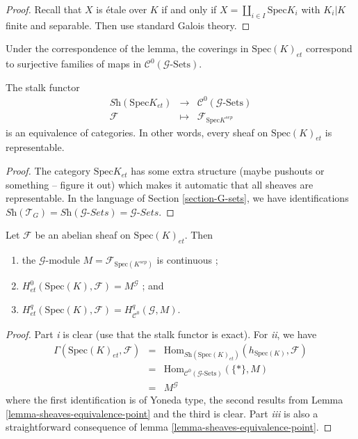 \begin{proof}
Recall that $X$ is \'etale over $K$ if and only if $X=\coprod_{i\in I}
\text{Spec} K_i$ with $K_i | K$ finite and separable. Then use standard Galois
theory.
\end{proof}

\begin{remark}
\label{remark-covering-surjective}
Under the correspondence of the lemma, the coverings in
$\text{Spec}(K)_{et}$ correspond to surjective families of maps in
$\mathcal{C}^0(\mathcal{G}\text{-Sets})$.
\end{remark}

\begin{lemma}
\label{lemma-sheaves-equivalence-point}
The stalk functor
$$
\begin{matrix}
\textit{Sh}(\text{Spec} K_{et}) & \longrightarrow &
\mathcal{C}^0(\mathcal{G}\text{-Sets}) \\
\mathcal{F} & \longmapsto & \mathcal{F}_{\text{Spec} K^{sep}}
\end{matrix}
$$
is an equivalence of categories. In other words, every sheaf on
$\text{Spec}(K)_{et}$ is representable.
\end{lemma}

\begin{proof}
The category $\text{Spec} K_{et}$ has some extra structure (maybe pushouts or
something -- figure it out) which makes it automatic that all sheaves are
representable. In the language of Section \ref{section-G-sets}, we have
identifications $\textit{Sh}(\mathcal{T}_G) =
\textit{Sh}(\mathcal{G}\textit{-Sets}) = \mathcal{G}\textit{-Sets}$.
\end{proof}

\begin{lemma}
\label{lemma-compare-cohomology-point}
Let $\mathcal{F}$ be an abelian sheaf on $\text{Spec}(K)_{et}$. Then
\begin{enumerate}
\item the $\mathcal{G}$-module $M = \mathcal{F}_{\text{Spec}(K^{sep})}$ is
continuous ;
\item $H_{et}^0(\text{Spec}(K), \mathcal{F})=M^{\mathcal{G}}$ ; and
\item $H_{et}^q(\text{Spec}(K), \mathcal{F}) = H_{\mathcal{C}^0}^q(\mathcal{G},
M)$.
\end{enumerate}
\end{lemma}

\begin{proof}
Part {\it i} is clear (use that the stalk functor is exact). For {\it ii}, we
have
\begin{eqnarray*}
\Gamma(\text{Spec}(K)_{et}, \mathcal{F}) & = &
\text{Hom}_{\textit{Sh}(\text{Spec}(K)_{et})}(h_{\text{Spec}(K)}, \mathcal{F})
\\
& = & \text{Hom}_{\mathcal{C}^0(\mathcal{G}\text{-Sets})}(\{*\}, M) \\
& = & M^{\mathcal{G}}
\end{eqnarray*}
where the first identification is of Yoneda type, the second results from
Lemma \ref{lemma-sheaves-equivalence-point}
and the third is clear. Part {\it iii} is also a
straightforward consequence of lemma \ref{lemma-sheaves-equivalence-point}.
\end{proof}

